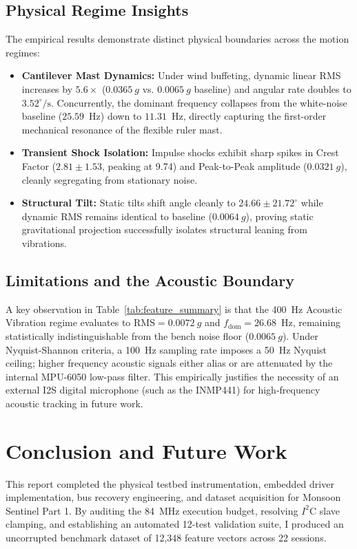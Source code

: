\documentclass[twocolumn]{article}
\begin{document}
\subsection{Physical Regime Insights}
The empirical results demonstrate distinct physical boundaries across the motion regimes:
\begin{itemize}[noitemsep]
    \item \textbf{Cantilever Mast Dynamics:} Under wind buffeting, dynamic linear RMS increases by $5.6\times$ ($0.0365~g$ vs. $0.0065~g$ baseline) and angular rate doubles to $3.52^\circ/\text{s}$. Concurrently, the dominant frequency collapses from the white-noise baseline ($25.59$~Hz) down to $11.31$~Hz, directly capturing the first-order mechanical resonance of the flexible ruler mast.
    \item \textbf{Transient Shock Isolation:} Impulse shocks exhibit sharp spikes in Crest Factor ($2.81 \pm 1.53$, peaking at 9.74) and Peak-to-Peak amplitude ($0.0321~g$), cleanly segregating from stationary noise.
    \item \textbf{Structural Tilt:} Static tilts shift angle cleanly to $24.66 \pm 21.72^\circ$ while dynamic RMS remains identical to baseline ($0.0064~g$), proving static gravitational projection successfully isolates structural leaning from vibrations.
\end{itemize}

\subsection{Limitations and the Acoustic Boundary}
A key observation in Table~\ref{tab:feature_summary} is that the 400~Hz Acoustic Vibration regime evaluates to $\text{RMS} = 0.0072~g$ and $f_{\text{dom}} = 26.68$~Hz, remaining statistically indistinguishable from the bench noise floor ($0.0065~g$). Under Nyquist-Shannon criteria, a 100~Hz sampling rate imposes a 50~Hz Nyquist ceiling; higher frequency acoustic signals either alias or are attenuated by the internal MPU-6050 low-pass filter. This empirically justifies the necessity of an external I2S digital microphone (such as the INMP441) for high-frequency acoustic tracking in future work.

\section{Conclusion and Future Work}
This report completed the physical testbed instrumentation, embedded driver implementation, bus recovery engineering, and dataset acquisition for Monsoon Sentinel Part 1. By auditing the 84~MHz execution budget, resolving $I^2\text{C}$ slave clamping, and establishing an automated 12-test validation suite, I produced an uncorrupted benchmark dataset of 12,348 feature vectors across 22 sessions.
\end{document}
